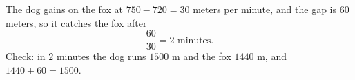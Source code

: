 The dog gains on the fox at $750-720=30$ meters per minute, and the gap is $60$ meters, so it catches the fox after
\[
\dfrac{60}{30}=\boxed{2}\text{ minutes}.
\]
Check: in $2$ minutes the dog runs $1500$ m and the fox $1440$ m, and $1440+60=1500$.
